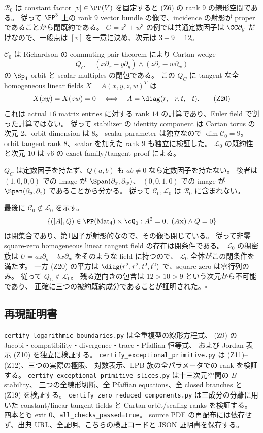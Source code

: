$\mathcal R_0$ は constant factor $[v]\in\PP(V)$ を固定すると (Z6) の
rank $9$ の線形空間である。
従って $\PP^3$ 上の rank $9$ vector bundle の像で、incidence の射影が proper
であることから閉既約である。
$G=z^3+w^3$ の例では共通定数因子は $\CC\partial_y$ だけなので、一般点は
$[v]$ を一意に決め、次元は $3+9=12$。

$\mathcal C_0$ は Richardson の commuting-pair theorem \cite[Theorem A]{Richardson} により Cartan wedge
\[
 Q_C=(x\partial_x-y\partial_y)\wedge(z\partial_z-w\partial_w)
\]
の $\Sp_4$ orbit と scalar multiples の閉包である。
この $Q_C$ に tangent な全 homogeneous linear fields $X=A(x,y,z,w)^T$ は
\[
 X(xy)=X(zw)=0\quad\Longleftrightarrow\quad
 A=\diag(r,-r,t,-t).                                      \tag{Z20}
\]
これは actual $16$ matrix entries に対する rank $14$ の計算であり、Euler field
で割った計算ではない。
従って stabilizer の identity component は Cartan torus の次元 $2$、orbit dimension は $8$。
scalar parameter は独立なので $\dim\mathcal C_0=9$。
orbit tangent rank $8$、scalar を加えた rank $9$ も独立に検証した。
$\mathcal L_0$ の既約性と次元 $10$ は v6 の exact family/tangent proof による。

$Q_C$ は定数因子を持たず、$Q(a,b)$ も $ab\ne0$ なら定数因子を持たない。
後者は $(1,0,0,0)$ での image が $\Span(\partial_x,\partial_w)$、
$(0,0,1,0)$ での image が $\Span(\partial_y,\partial_z)$ であることから分かる。
従って $\mathcal C_0,\mathcal L_0$ は $\mathcal R_0$ に含まれない。

最後に $\mathcal C_0\not\subset\mathcal L_0$ を示す。
\[
 \{([A],Q)\in\PP(\operatorname{Mat}_4)\times\cQ_0:
        A^2=0,\ (A\mathbf x)\wedge Q=0\}
\]
は閉集合であり、第1因子が射影的なので、その像も閉じている。
従って非零 square-zero homogeneous linear tangent field の存在は閉条件である。
$\mathcal L_0$ の稠密族は $U=az\partial_y+bx\partial_w$ をそのような field に持つので、
$\mathcal L_0$ 全体がこの閉条件を満たす。
一方 (Z20) の平方は $\diag(r^2,r^2,t^2,t^2)$ で、square-zero は零行列のみ。
従って $Q_C\notin\mathcal L_0$。
残る逆向きの包含は $12>10>9$ という次元から不可能であり、
正確に三つの被約既約成分であることが証明された。\hfill$\square$

\subsection{再現証明書}

\texttt{certify\_logarithmic\_boundaries.py} は全重複型の線形方程式、
(Z9) の Jacobi・compatibility・divergence・trace・Pfaffian 恒等式、
および Jordan 表示 (Z10) を独立に検証する。
\texttt{certify\_exceptional\_primitive.py} は (Z11)--(Z12)、三つの実際の極限、
対数表示、LPB 族の全パラメータでの rank を検証する。
\texttt{certify\_exceptional\_primitive\_slices.py} は十三次元空間の $B$-stability、
三つの全線形切断、全 Pfaffian equations、全 closed branches と (Z19) を検証する。
\texttt{certify\_zero\_reduced\_components.py} は三成分の分離に用いた
constant/linear tangent fields と Cartan orbit/scaling ranks を検証する。
四本とも exit $0$、\texttt{all\_checks\_passed=true}。
source PDF の再配布には依存せず、出典 URL、全証明、こちらの検証コードと
JSON 証明書を保存する。
